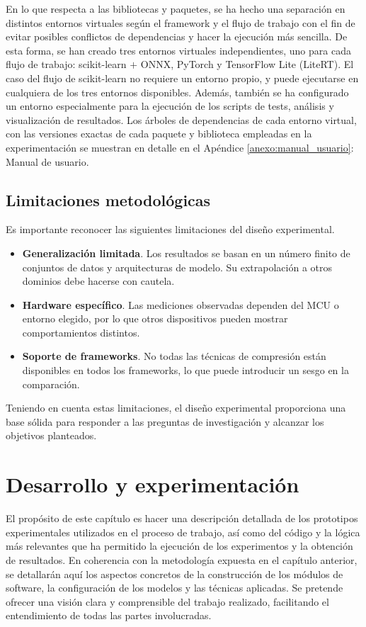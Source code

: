 \documentclass[a4paper,12pt,twoside,final]{book}
\begin{document}
En lo que respecta a las bibliotecas y paquetes, se ha hecho una separación en distintos entornos virtuales según el
framework y el flujo de trabajo con el fin de evitar posibles conflictos de dependencias y hacer la ejecución más
sencilla. De esta forma, se han creado tres entornos virtuales independientes, uno para cada flujo de trabajo:
scikit-learn $+$ ONNX, PyTorch y TensorFlow Lite (LiteRT). El caso del flujo de scikit-learn no requiere un entorno
propio, y puede ejecutarse en cualquiera de los tres entornos disponibles. Además, también se ha configurado un entorno
especialmente para la ejecución de los scripts de tests, análisis y visualización de resultados. Los árboles de
dependencias de cada entorno virtual, con las versiones exactas de cada paquete y biblioteca empleadas en la
experimentación se muestran en detalle en el Apéndice \ref{anexo:manual_usuario}: Manual de usuario.

\section{Limitaciones metodológicas}
Es importante reconocer las siguientes limitaciones del diseño experimental.
\begin{itemize}
  \item \textbf{Generalización limitada}. Los resultados se basan en un número finito de conjuntos de datos y
  arquitecturas de modelo. Su extrapolación a otros dominios debe hacerse con cautela.
  \item \textbf{Hardware específico}. Las mediciones observadas dependen del MCU o entorno elegido, por lo que otros
  dispositivos pueden mostrar comportamientos distintos.
  \item \textbf{Soporte de frameworks}. No todas las técnicas de compresión están disponibles en todos los
  frameworks, lo que puede introducir un sesgo en la comparación.
\end{itemize}

Teniendo en cuenta estas limitaciones, el diseño experimental proporciona una base sólida para responder a las
preguntas de investigación y alcanzar los objetivos planteados.


\chapter{Desarrollo y experimentación}
El propósito de este capítulo es hacer una descripción detallada de los prototipos experimentales utilizados en el
proceso de trabajo, así como del código y la lógica más relevantes que ha permitido la ejecución de los experimentos
y la obtención de resultados. En coherencia con la metodología expuesta en el capítulo anterior, se detallarán aquí
los aspectos concretos de la construcción de los módulos de software, la configuración de los modelos y las técnicas
aplicadas. Se pretende ofrecer una visión clara y comprensible del trabajo realizado, facilitando el entendimiento de
todas las partes involucradas.\\
\end{document}
